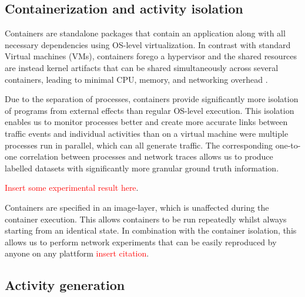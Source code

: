 \documentclass[sigconf]{acmart}
\begin{document}
\subsection{Containerization and activity isolation}
Containers are standalone packages that contain an application along with all necessary dependencies using OS-level virtualization. In contrast with standard Virtual machines (VMs), containers forego a hypervisor and the shared resources are instead kernel artifacts that can be shared simultaneously across several containers, leading to minimal CPU, memory, and networking overhead \cite{kolyshkin2006virtualization}.



Due to the separation of processes, containers provide significantly more isolation of programs from external effects than regular OS-level execution. This isolation enables us to monitor processes better and create more accurate links between traffic events and individual activities than on a virtual machine were multiple processes run in parallel, which can all generate traffic. The corresponding one-to-one correlation between processes and network traces allows us to produce labelled datasets with significantly more granular ground truth information.

\textcolor{red}{Insert some experimental result here}.

Containers are specified in an image-layer, which is unaffected during the container execution.
This allows containers to be run repeatedly whilst always starting from an identical state. In combination with the container isolation, this allows us to perform network experiments that can be easily reproduced by anyone on any plattform \textcolor{red}{insert citation}. 

 

\subsection{Activity generation}\label{Sec:Scenarios}
\end{document}
